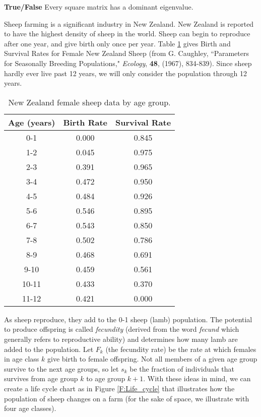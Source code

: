 \item \textbf{True/False} Every square matrix has a dominant eigenvalue. 
\ea

\ee

\label{sec:proj_sheep_herd}

Sheep farming is a significant industry in New Zealand. New Zealand is reported to have the highest density of sheep in the world. Sheep can begin to reproduce after one year, and give birth only once per year. Table \ref{T:Sheep} gives Birth and Survival Rates for Female New Zealand Sheep (from G. Caughley, ``Parameters for Seasonally Breeding Populations," \emph{Ecology}, \textbf{48}, (1967), 834-839). Since sheep hardly ever live past 12 years, we will only consider the population through 12 years.
\begin{table}[h]
\begin{center}
\begin{tabular}{| c | c | c |}  \hline
Age (years) &Birth Rate 	&Survival Rate \\ \hline
0-1 		&0.000 			&0.845 \\ \hline
1-2 		&0.045 			&0.975 \\ \hline
2-3 		&0.391 			&0.965 \\ \hline
3-4 		&0.472 			&0.950 \\ \hline
4-5 		&0.484 			&0.926 \\ \hline
5-6 		&0.546 			&0.895 \\ \hline
6-7 		&0.543 			&0.850 \\ \hline
7-8 		&0.502 			&0.786 \\ \hline
8-9 		&0.468 			&0.691 \\ \hline
9-10 		&0.459 			&0.561 \\ \hline
10-11 	&0.433 			&0.370 \\ \hline
11-12 	&0.421 			&0.000 \\ \hline
\end{tabular}
\caption{New Zealand female sheep data by age group.}
\label{T:Sheep}
\end{center}
\end{table}

As sheep reproduce, they add to the 0-1 sheep (lamb) population. The potential to produce offspring is called \emph{fecundity} (derived from the word \emph{fecund} which generally refers to reproductive ability) and determines how many lamb are added to the population. Let $F_k$ (the fecundity rate) be the rate at which females in age class $k$ give birth to female offspring. Not all members of a given age group survive to the next age groups, so let $s_k$ be the fraction of individuals that survives from age group $k$ to age group $k+1$. With these ideas  in mind, we can create a life cycle chart as in Figure \ref{F:Life_cycle} that illustrates how the population of sheep changes on a farm (for the sake of space, we illustrate with four age classes). 


